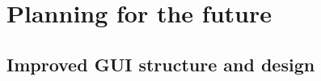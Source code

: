 \documentclass[paper=a4, fontsize=11pt]{scrartcl}	%
\numberwithin{equation}{section}															%
\numberwithin{figure}{section}																%
\numberwithin{table}{section}																%
\begin{document}
\section{Planning for the future}
\subsection{Improved GUI structure and design}
\label{subsec:GUI-Improvements}



\end{document}
